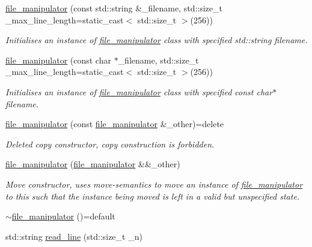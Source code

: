 \begin{DoxyCompactItemize}
\item 
\hyperlink{classcrsc_1_1file__manipulator_a4e02c75c74104a29054f9f24846a3dea}{file\+\_\+manipulator} (const std\+::string \&\+\_\+filename, std\+::size\+\_\+t \+\_\+max\+\_\+line\+\_\+length=static\+\_\+cast$<$ std\+::size\+\_\+t $>$(256))
\begin{DoxyCompactList}\small\item\em Initialises an instance of \hyperlink{classcrsc_1_1file__manipulator}{file\+\_\+manipulator} class with specified std\+::string filename. \end{DoxyCompactList}\item 
\hyperlink{classcrsc_1_1file__manipulator_aca2b339d9a2b6e38322789bdaa0c42c2}{file\+\_\+manipulator} (const char $\ast$\+\_\+filename, std\+::size\+\_\+t \+\_\+max\+\_\+line\+\_\+length=static\+\_\+cast$<$ std\+::size\+\_\+t $>$(256))
\begin{DoxyCompactList}\small\item\em Initialises an instance of \hyperlink{classcrsc_1_1file__manipulator}{file\+\_\+manipulator} class with specified const char$\ast$ filename. \end{DoxyCompactList}\item 
\hyperlink{classcrsc_1_1file__manipulator_a4d43340e830139b665ce2f53a671c95f}{file\+\_\+manipulator} (const \hyperlink{classcrsc_1_1file__manipulator}{file\+\_\+manipulator} \&\+\_\+other)=delete
\begin{DoxyCompactList}\small\item\em Deleted copy constructor, copy construction is forbidden. \end{DoxyCompactList}\item 
\hyperlink{classcrsc_1_1file__manipulator_a92b89345ebcf56a6874ca73b11144865}{file\+\_\+manipulator} (\hyperlink{classcrsc_1_1file__manipulator}{file\+\_\+manipulator} \&\&\+\_\+other)
\begin{DoxyCompactList}\small\item\em Move constructor, uses move-\/semantics to move an instance of \hyperlink{classcrsc_1_1file__manipulator}{file\+\_\+manipulator} to this such that the instance being moved is left in a valid but unspecified state. \end{DoxyCompactList}\item 
\hyperlink{classcrsc_1_1file__manipulator_adeb7ca782287ebc8290b0110dd7fcb04}{$\sim$file\+\_\+manipulator} ()=default
\item 
std\+::string \hyperlink{classcrsc_1_1file__manipulator_a195cb7124548fdde2f5d55e8dc522b21}{read\+\_\+line} (std\+::size\+\_\+t \+\_\+n)

\end{DoxyCompactItemize}
